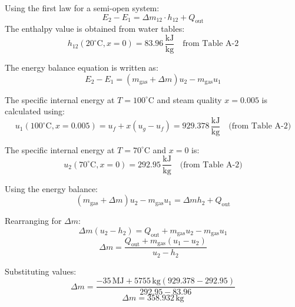 Using the first law for a semi-open system:  
\[
E_2 - E_1 = \Delta m_{12} \cdot h_{12} + Q_{\text{out}}
\]  
The enthalpy value is obtained from water tables:  
\[
h_{12}(20^\circ\text{C}, x=0) = 83.96 \, \frac{\text{kJ}}{\text{kg}} \quad \text{from Table A-2}
\]

The energy balance equation is written as:  
\[
E_2 - E_1 = (m_{\text{gas}} + \Delta m) u_2 - m_{\text{gas}} u_1
\]  

The specific internal energy at \( T = 100^\circ\text{C} \) and steam quality \( x = 0.005 \) is calculated using:  
\[
u_1(100^\circ\text{C}, x = 0.005) = u_f + x(u_g - u_f) = 929.378 \, \frac{\text{kJ}}{\text{kg}} \quad \text{(from Table A-2)}
\]  

The specific internal energy at \( T = 70^\circ\text{C} \) and \( x = 0 \) is:  
\[
u_2(70^\circ\text{C}, x = 0) = 292.95 \, \frac{\text{kJ}}{\text{kg}} \quad \text{(from Table A-2)}
\]  

Using the energy balance:  
\[
(m_{\text{gas}} + \Delta m) u_2 - m_{\text{gas}} u_1 = \Delta m h_2 + Q_{\text{out}}
\]  

Rearranging for \( \Delta m \):  
\[
\Delta m (u_2 - h_2) = Q_{\text{out}} + m_{\text{gas}} u_2 - m_{\text{gas}} u_1
\]  
\[
\Delta m = \frac{Q_{\text{out}} + m_{\text{gas}} (u_1 - u_2)}{u_2 - h_2}
\]  

Substituting values:  
\[
\Delta m = \frac{-35 \, \text{MJ} + 5755 \, \text{kg} (929.378 - 292.95)}{292.95 - 83.96}
\]  
\[
\Delta m = 358.932 \, \text{kg}
\]